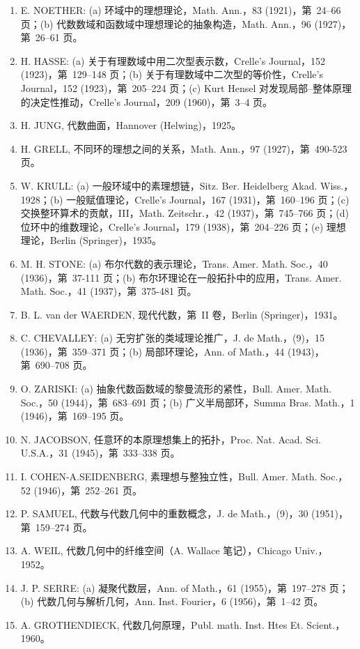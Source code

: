 \begin{enumerate}
  A. OSTROWSKI, 关于函数方程 \(\phi(x)\phi(y) = \phi(x.y)\) 的一些解，Acta Math.，41 (1917)，第~271-284 页。
\item
  E. NOETHER: (a) 环域中的理想理论，Math. Ann.，83 (1921)，第~24--66 页；(b) 代数数域和函数域中理想理论的抽象构造，Math. Ann.，96 (1927)，第~26--61 页。
\item
  H. HASSE: (a) 关于有理数域中用二次型表示数，Crelle's Journal，152 (1923)，第~129--148 页；(b) 关于有理数域中二次型的等价性，Crelle's Journal，152 (1923)，第~205--224 页；(c) Kurt Hensel 对发现局部--整体原理的决定性推动，Crelle's Journal，209 (1960)，第~3--4 页。
\item
  H. JUNG, 代数曲面，Hannover (Helwing)，1925。
\item
  H. GRELL, 不同环的理想之间的关系，Math. Ann.，97 (1927)，第~490-523 页。
\item
  W. KRULL: (a) 一般环域中的素理想链，Sitz. Ber. Heidelberg Akad. Wiss.，1928；(b) 一般赋值理论，Crelle's Journal，167 (1931)，第~160--196 页；(c) 交换整环算术的贡献，III，Math. Zeitschr.，42 (1937)，第~745--766 页；(d) 位环中的维数理论，Crelle's Journal，179 (1938)，第~204--226 页；(e) 理想理论，Berlin (Springer)，1935。
\item
  M. H. STONE: (a) 布尔代数的表示理论，Trans. Amer. Math. Soc.，40 (1936)，第~37-111 页；(b) 布尔环理论在一般拓扑中的应用，Trans. Amer. Math. Soc.，41 (1937)，第~375-481 页。
\item
  B. L. van der WAERDEN, 现代代数，第~II 卷，Berlin (Springer)，1931。
\item
  C. CHEVALLEY: (a) 无穷扩张的类域理论推广，J. de Math.，(9)，15 (1936)，第~359--371 页；(b) 局部环理论，Ann. of Math.，44 (1943)，第~690--708 页。
\item
  O. ZARISKI: (a) 抽象代数函数域的黎曼流形的紧性，Bull. Amer. Math. Soc.，50 (1944)，第~683--691 页；(b) 广义半局部环，Summa Bras. Math.，1 (1946)，第~169--195 页。
\item
  N. JACOBSON, 任意环的本原理想集上的拓扑，Proc. Nat. Acad. Sci. U.S.A.，31 (1945)，第~333--338 页。
\item
  I. COHEN-A.SEIDENBERG, 素理想与整独立性，Bull. Amer. Math. Soc.，52 (1946)，第~252--261 页。
\item
  P. SAMUEL, 代数与代数几何中的重数概念，J. de Math.，(9)，30 (1951)，第~159--274 页。
\item
  A. WEIL, 代数几何中的纤维空间（A. Wallace 笔记），Chicago Univ.，1952。
\item
  J. P. SERRE: (a) 凝聚代数层，Ann. of Math.，61 (1955)，第~197--278 页；(b) 代数几何与解析几何，Ann. Inst. Fourier，6 (1956)，第~1--42 页。
\item
  A. GROTHENDIECK, 代数几何原理，Publ. math. Inst. Htes Et. Scient.，1960。
\end{enumerate}

